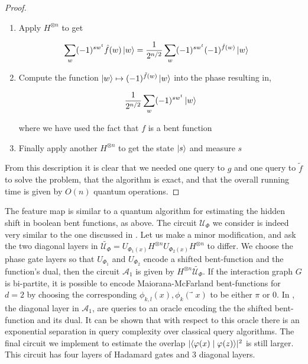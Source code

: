 \documentclass[main.tex]{subfiles}
\begin{document}
\begin{theorem}
\begin{proof}
\begin{enumerate}
\item Apply $H^{\otimes n}$ to get

\begin{align*}
\sum_w (-1)^{sw^t}\hat{f}(w) \ket{w} &= \frac{1}{2^{n/2}} \sum_w (-1)^{sw^t}(-1)^{\hat{f}(w)}\ket{w}	
\end{align*}

\item Compute the function $\ket{w} \mapsto (-1)^{\tilde{f}(w)}\ket{w}$ into the phase resulting in,

\begin{align*}
\frac{1}{2^{n/2}}\sum_w (-1)^{sw^t} \ket{w}	
\end{align*}

where we have used the fact that $f$ is a bent function

\item Finally apply another $H^{\otimes n}$ to get the state $\ket{s}$ and measure $s$
\end{enumerate}

From this description it is clear that we needed one query to $g$ and one query to $\tilde{f}$ to solve the problem, that the algorithm is exact, and that the overall running time is given by $O(n)$ quantum operations.
\end{proof}
\end{theorem}

 The feature map is similar to a quantum algorithm for estimating the hidden shift in boolean bent functions, as above. The circuit $\mathcal{U}_\Phi$ we consider is indeed very similar to the one discussed in \cite{rotteler2010quantum}. Let us make a minor modification, and ask the two diagonal layers in $\tilde{\mathcal{U}_\Phi} = U_{\Phi_1(x)} H^{\otimes n} U_{\Phi_2(x)} H^{\otimes n}$ to differ. We choose the phase gate layers so that $U_{\Phi_1}$ and $U_{\Phi_2}$ encode a shifted bent-function and the function’s dual, then the circuit $\mathcal{A}_1$ is given by $H^{\otimes n} \tilde{\mathcal{U}_\Phi}$. If the interaction graph $G$ is bi-partite, it is possible to encode Maiorana-McFarland bent-functions for $d = 2$ by choosing the corresponding $\phi_{k,l}(x),\phi_k(⃗x)$ to be either $\pi$ or $0$. In \cite{rotteler2010quantum}, the diagonal layer in $\mathcal{A}_1$, are queries to an oracle encoding the the shifted bent-function and its dual. It can be shown that with respect to this oracle there is an exponential separation in query complexity over classical query algorithms. The final circuit we implement to estimate the overlap $|\langle \varphi(x) \mid \varphi(z) \rangle|^2$ is still larger. This circuit has four layers of Hadamard gates and 3 diagonal layers. 
 
\end{document}
